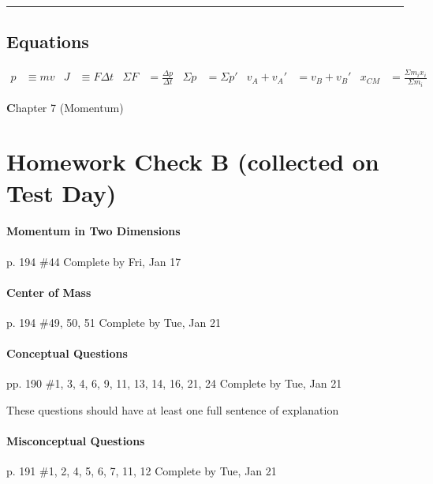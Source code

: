 \documentclass[10pt]{exam}
\def\mytitle{Chapter 7 (Momentum)}
\def\mymaketitle{
  \begin{flushleft}
    {\LARGE \textbf \mytitle \par}
  \end{flushleft}
}
\begin{document}
\vspace{1em}
\hrule 

\subsection*{Equations}

\begin{align*}
  p &\equiv mv &
  J &\equiv F\Delta t &
  \Sigma F &= \frac{\Delta p}{\Delta t} &
  \Sigma p &= \Sigma p ' &
  v_A + v_A' &= v_B + v_B' &
  x_{CM} &= \frac{\Sigma m_i x_i}{\Sigma m_i}
\end{align*}



\pagebreak

\mymaketitle

\section*{Homework Check B (collected on Test Day)}

\paragraph{Momentum in Two Dimensions} p. 194 \#44
\dotfill Complete by Fri, Jan 17





\paragraph{Center of Mass} p. 194 \#49, 50, 51
\dotfill Complete by Tue, Jan 21




\paragraph{Conceptual Questions} pp. 190 \#1, 3, 4, 6, 9, 11, 13, 14, 16, 21, 24
\dotfill Complete by Tue, Jan 21
   
{\sc These questions should have at least one full sentence 
      of explanation}



\paragraph{Misconceptual Questions} p. 191 \#1, 2, 4, 5, 6, 7, 11, 12
\dotfill Complete by Tue, Jan 21
   
\end{document}

